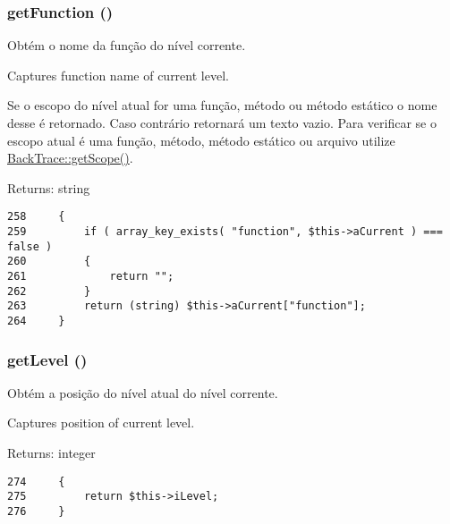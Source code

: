 \hypertarget{class_back_trace_3cb728ca27acfebd282caecdb8a1f5fc}{
\subsubsection[{getFunction}]{\setlength{\rightskip}{0pt plus 5cm}getFunction ()}}
\label{class_back_trace_3cb728ca27acfebd282caecdb8a1f5fc}


Obtém o nome da função do nível corrente.

Captures function name of current level.

Se o escopo do nível atual for uma função, método ou método estático o nome desse é retornado. Caso contrário retornará um texto vazio. Para verificar se o escopo atual é uma função, método, método estático ou arquivo utilize \hyperlink{class_back_trace_0dce4e854dda57ffc316fd755df9b309}{BackTrace::getScope()}.

\begin{Desc}
\item[Returns:]string \end{Desc}


\begin{Code}\begin{verbatim}258     {
259         if ( array_key_exists( "function", $this->aCurrent ) === false )
260         {
261             return "";
262         }
263         return (string) $this->aCurrent["function"];
264     }
\end{verbatim}
\end{Code}


\hypertarget{class_back_trace_23fac327059bf3fd0fe57555252d8cf2}{
\subsubsection[{getLevel}]{\setlength{\rightskip}{0pt plus 5cm}getLevel ()}}
\label{class_back_trace_23fac327059bf3fd0fe57555252d8cf2}


Obtém a posição do nível atual do nível corrente.

Captures position of current level.

\begin{Desc}
\item[Returns:]integer \end{Desc}


\begin{Code}\begin{verbatim}274     {
275         return $this->iLevel;
276     }
\end{verbatim}
\end{Code}


